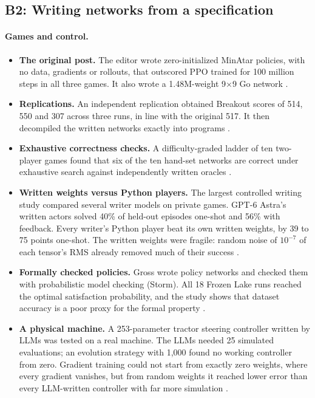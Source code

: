 \subsection{B2: Writing networks from a specification}
\label{sec:write}

\paragraph{Games and control.}
\begin{itemize}[leftmargin=*,itemsep=2pt]
\item \textbf{The original post.} The editor wrote zero-initialized MinAtar policies, with no data, gradients or rollouts, that outscored PPO trained for 100 million steps in all three games. It also wrote a 1.48M-weight 9$\times$9 Go network \citep{takehi2026sparks}.
\item \textbf{Replications.} An independent replication obtained Breakout scores of 514, 550 and 307 across three runs, in line with the original 517. It then decompiled the written networks exactly into programs \citep{ax2611_21449}.
\item \textbf{Exhaustive correctness checks.} A difficulty-graded ladder of ten two-player games found that six of the ten hand-set networks are correct under exhaustive search against independently written oracles \citep{ax2611_09271}.
\item \textbf{Written weights versus Python players.} The largest controlled writing study compared several writer models on private games. GPT-6 Astra's written actors solved 40\% of held-out episodes one-shot and 56\% with feedback. Every writer's Python player beat its own written weights, by 39 to 75 points one-shot. The written weights were fragile: random noise of $10^{-7}$ of each tensor's RMS already removed much of their success \citep{ax2611_16981}.
\item \textbf{Formally checked policies.} Gross wrote policy networks and checked them with probabilistic model checking (Storm). All 18 Frozen Lake runs reached the optimal satisfaction probability, and the study shows that dataset accuracy is a poor proxy for the formal property \citep{ax2611_11604}.
\item \textbf{A physical machine.} A 253-parameter tractor steering controller written by LLMs was tested on a real machine. The LLMs needed 25 simulated evaluations; an evolution strategy with 1{,}000 found no working controller from zero. Gradient training could not start from exactly zero weights, where every gradient vanishes, but from random weights it reached lower error than every LLM-written controller with far more simulation \citep{ax2611_21958}.
\end{itemize}

